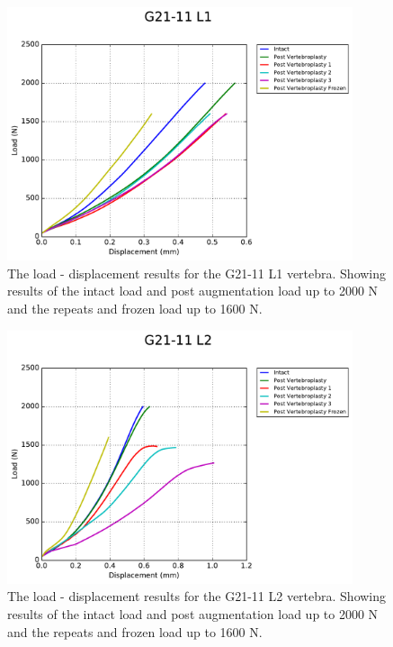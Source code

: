\begin{figure}[H]
\centering
\includegraphics[width=4in]{Chapters/Chapter_HT_images/G21-11_L1.pdf}
\caption{The load - displacement results for the G21-11 L1 vertebra. Showing results of the intact load and post augmentation load up to 2000 N and the repeats and frozen load up to 1600 N.}
\label{fig:G21-11_L1}
\end{figure}

\begin{figure}[H]
\centering
\includegraphics[width=4in]{Chapters/Chapter_HT_images/G21-11_L2.pdf}
\caption{The load - displacement results for the G21-11 L2 vertebra. Showing results of the intact load and post augmentation load up to 2000 N and the repeats and frozen load up to 1600 N.}
\label{fig:G21-11_L2}
\end{figure}

